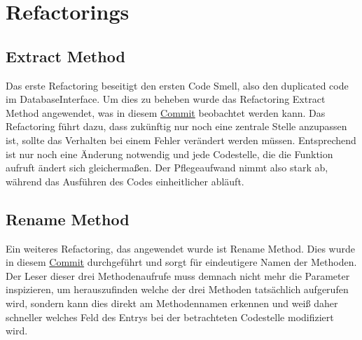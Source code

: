 \section{Refactorings}
\subsection{Extract Method}
Das erste Refactoring beseitigt den ersten Code Smell, also den duplicated code im DatabaseInterface. Um dies zu beheben wurde das Refactoring Extract Method angewendet, was in diesem \href{https://github.com/moorts/Morik/commit/09ea85004227950dbf7d30e7bb6de26f92b1ea85}{Commit} beobachtet werden kann. Das Refactoring führt dazu, dass zukünftig nur noch eine zentrale Stelle anzupassen ist, sollte das Verhalten bei einem Fehler verändert werden müssen. Entsprechend ist nur noch eine Änderung notwendig und jede Codestelle, die die Funktion aufruft ändert sich gleichermaßen. Der Pflegeaufwand nimmt also stark ab, während das Ausführen des Codes einheitlicher abläuft.

\subsection{Rename Method}
Ein weiteres Refactoring, das angewendet wurde ist Rename Method. Dies wurde in diesem \href{https://github.com/moorts/Morik/commit/e807014b1ae894640a8a87f2765fa2ba5d95ea19}{Commit} durchgeführt und sorgt für eindeutigere Namen der Methoden. Der Leser dieser drei Methodenaufrufe muss demnach nicht mehr die Parameter inspizieren, um herauszufinden welche der drei Methoden tatsächlich aufgerufen wird, sondern kann dies direkt am Methodennamen erkennen und weiß daher schneller welches Feld des Entrys bei der betrachteten Codestelle modifiziert wird.
